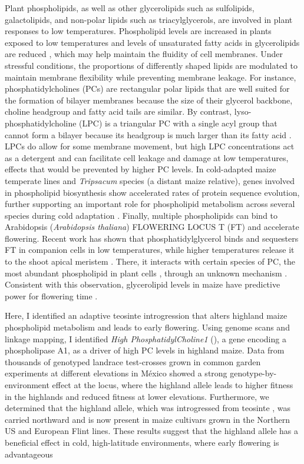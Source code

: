 Plant phospholipids, as well as other glycerolipids such as sulfolipids, galactolipids, and non-polar lipids such as triacylglycerols, are involved in plant responses to low temperatures.
Phospholipid levels are increased in plants exposed to low temperatures \citep{degenkolbe2012-wf} and levels of unsaturated fatty acids in glycerolipids are reduced \citep{welti2002-uk, lynch1987-ln}, which may help maintain the fluidity of cell membranes.
Under stressful conditions, the proportions of differently shaped lipids are modulated to maintain membrane flexibility while preventing membrane leakage. 
For instance, phosphatidylcholines (PCs) are rectangular polar lipids that are well suited for the formation of bilayer membranes because the size of their glycerol backbone, choline headgroup and fatty acid tails are similar.
By contrast, lyso-phosphatidylcholine (LPC) is a triangular PC with a single acyl group that cannot form a bilayer because its headgroup is much larger than its fatty acid \citep{jouhet2013-fv}.
LPCs do allow for some membrane movement, but high LPC concentrations act as a detergent \citep{henriksen2010-cm} and can facilitate cell leakage and damage at low temperatures, effects that would be prevented by higher PC levels.
In cold-adapted maize temperate lines and \textit{Tripsacum} species (a distant maize relative), genes involved in  phospholipid biosynthesis show accelerated rates of protein sequence evolution, further supporting an important role for phospholipid metabolism across several species during cold adaptation \citep{yan2019-tx}. 
Finally, multiple phospholipids can bind to Arabidopsis (\textit{Arabidopsis thaliana}) FLOWERING LOCUS T (FT) and accelerate flowering.
Recent work has shown that phosphatidylglycerol binds and sequesters FT in companion cells in low temperatures, while higher temperatures release it to the shoot apical meristem \citep{susila2021-dz}.
There, it interacts with certain species of PC, the most abundant phospholipid in plant cells \citep{gu2017-nd},  through an unknown mechanism \citep{nakamura2014-qf}. 
Consistent with this observation, glycerolipid levels in maize have predictive power for flowering time \citep{riedelsheimer2013-bd}. 

Here, I identified an adaptive teosinte \mex introgression that alters highland maize phospholipid metabolism and leads to early flowering.
Using genome scans and linkage mapping, I identified \textit{High PhosphatidylCholine1} (\hpc), a gene encoding a phospholipase A1, as a driver of high PC levels in highland maize. 
Data from thousands of genotyped landrace test-crosses grown in common garden experiments at different elevations in M\'exico showed a strong genotype-by-environment effect at the \hpc locus, where the highland allele leads to higher fitness in the highlands and reduced fitness at lower elevations.
Furthermore, we determined that the highland \hpc allele, which was introgressed from teosinte \mex, was carried northward and is now present in maize cultivars grown in the Northern US and European Flint lines.
These results suggest that the \hpc highland allele has a beneficial effect in cold, high-latitude environments, where early flowering is advantageous


